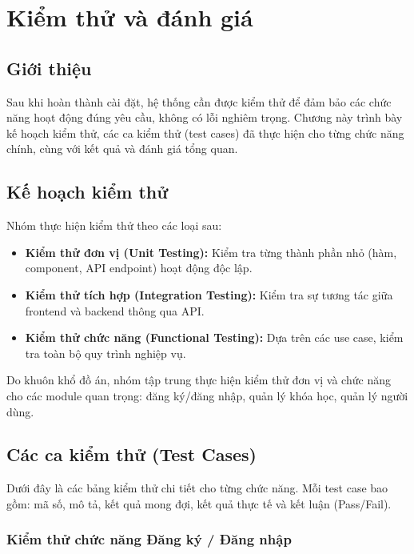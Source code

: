 \chapter{Kiểm thử và đánh giá}

\section{Giới thiệu}
Sau khi hoàn thành cài đặt, hệ thống cần được kiểm thử để đảm bảo các chức năng hoạt động đúng yêu cầu, không có lỗi nghiêm trọng. Chương này trình bày kế hoạch kiểm thử, các ca kiểm thử (test cases) đã thực hiện cho từng chức năng chính, cùng với kết quả và đánh giá tổng quan.

\section{Kế hoạch kiểm thử}
Nhóm thực hiện kiểm thử theo các loại sau:
\begin{itemize}
    \item \textbf{Kiểm thử đơn vị (Unit Testing):} Kiểm tra từng thành phần nhỏ (hàm, component, API endpoint) hoạt động độc lập.
    \item \textbf{Kiểm thử tích hợp (Integration Testing):} Kiểm tra sự tương tác giữa frontend và backend thông qua API.
    \item \textbf{Kiểm thử chức năng (Functional Testing):} Dựa trên các use case, kiểm tra toàn bộ quy trình nghiệp vụ.
\end{itemize}
Do khuôn khổ đồ án, nhóm tập trung thực hiện kiểm thử đơn vị và chức năng cho các module quan trọng: đăng ký/đăng nhập, quản lý khóa học, quản lý người dùng.

\section{Các ca kiểm thử (Test Cases)}
Dưới đây là các bảng kiểm thử chi tiết cho từng chức năng. Mỗi test case bao gồm: mã số, mô tả, kết quả mong đợi, kết quả thực tế và kết luận (Pass/Fail).

\subsection{Kiểm thử chức năng Đăng ký / Đăng nhập}

